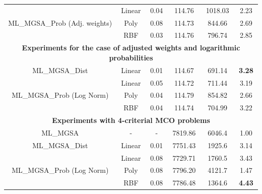 \documentclass[runningheads]{llncs}
\begin{document}
\begin{table}[t]
{\begin{tabular}{cccccc}
\multirow{3}{*}{ML\_MGSA\_Prob (Adj. weights)}                             & Linear     & 0.04 & 114.76  & 1018.03    & 2.23           \\
                                                                           & Poly       & 0.08 & 114.73  & 844.66    & 2.69           \\
                                                                           & RBF        & 0.03 & 114.76  & 796.74    & 2.85           \\ \hline
\multicolumn{6}{c}{\textbf{Experiments for the case of adjusted weights and logarithmic probabilities}}                                               \\ \hline
ML\_MGSA\_Dist                                                             & Linear     & 0.01 & 114.67  & 691.14    & \textbf{3.28}  \\
\multirow{3}{*}{ML\_MGSA\_Prob (Log Norm)}                                 & Linear     & 0.05 & 114.72  & 711.44    & 3.19           \\
                                                                           & Poly       & 0.04 & 114.79  & 854.82    & 2.66           \\
                                                                           & RBF        & 0.04 & 114.74  & 704.99    & 3.22           \\ \hline
\multicolumn{6}{c}{\textbf{Experiments with 4-criterial MCO problems}}                                                                \\ \hline
ML\_MGSA                                                                   & -          & -    & 7819.86 & 6046.4    & 1.00           \\ \hline
ML\_MGSA\_Dist                                                             & Linear     & 0.01 & 7751.43 & 1925.6    & 3.14           \\
\multirow{3}{*}{ML\_MGSA\_Prob (Log Norm)}                                 & Linear     & 0.08 & 7729.71 & 1760.5    & 3.43           \\
                                                                           & Poly       & 0.08 & 7796.20 & 4121.7    & 1.47           \\
                                                                           & RBF        & 0.08 & 7786.48 & 1364.6    & \textbf{4.43}  \\ \hline
\end{tabular}%
}
\end{table}
\end{document}

